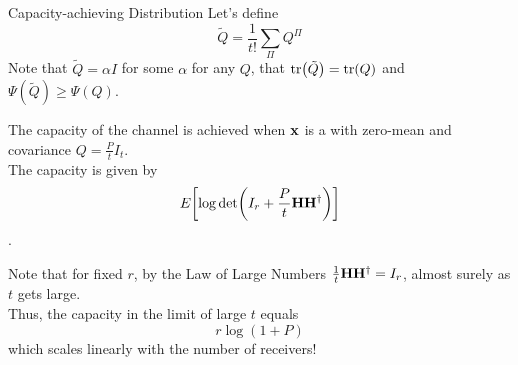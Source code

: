 \begin{frame}[allowframebreaks]{Capacity-achieving Distribution}
\medskip
Let's define
$$\tilde{Q} = \frac{1}{t!}\sum_\Pi Q^\Pi$$
Note that $\tilde{Q}=\alpha I$ for some $\alpha$ for any $Q$, that $\tr(\tilde{Q})=\tr(Q)$ and $\Psi(\tilde{Q})\geq\Psi(Q)$.

\framebreak

\begin{theorem}
	The capacity of the channel is achieved when $\vb{x}$ is a \cscg{} with zero-mean and covariance $Q=\frac{P}{t}I_t$.\\
	The capacity is given by
	$$E_{}\qty[\log\det(I_r + \frac{P}{t}\vb{H\ensuremath{H^\dagger}})]$$.
\end{theorem}

Note that for fixed $r$, by the Law of Large Numbers $\frac{1}{t}\vb{H\ensuremath{H^\dagger}} = I_r$, almost surely as $t$ gets large.\\ Thus, the capacity in the limit of large $t$ equals
$$r\log(1+P)$$
which scales linearly with the number of receivers!

\end{frame}

